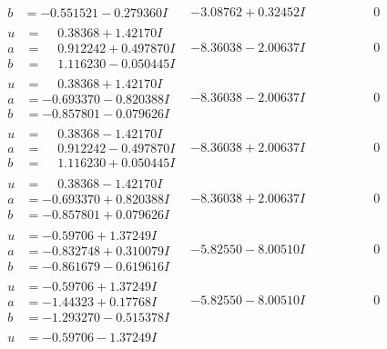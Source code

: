 \documentclass[1p]{elsarticle_modified}
\theoremstyle{definition}
\begin{document}
$$\begin{array}{c|c|c}
\begin{aligned}
b &= -0.551521 - 0.279360 I\end{aligned}
 & -3.08762 + 0.32452 I & \phantom{-0.000000 } 0 \\ \hline\begin{aligned}
u &= \phantom{-}0.38368 + 1.42170 I \\
a &= \phantom{-}0.912242 + 0.497870 I \\
b &= \phantom{-}1.116230 - 0.050445 I\end{aligned}
 & -8.36038 - 2.00637 I & \phantom{-0.000000 } 0 \\ \hline\begin{aligned}
u &= \phantom{-}0.38368 + 1.42170 I \\
a &= -0.693370 - 0.820388 I \\
b &= -0.857801 - 0.079626 I\end{aligned}
 & -8.36038 - 2.00637 I & \phantom{-0.000000 } 0 \\ \hline\begin{aligned}
u &= \phantom{-}0.38368 - 1.42170 I \\
a &= \phantom{-}0.912242 - 0.497870 I \\
b &= \phantom{-}1.116230 + 0.050445 I\end{aligned}
 & -8.36038 + 2.00637 I & \phantom{-0.000000 } 0 \\ \hline\begin{aligned}
u &= \phantom{-}0.38368 - 1.42170 I \\
a &= -0.693370 + 0.820388 I \\
b &= -0.857801 + 0.079626 I\end{aligned}
 & -8.36038 + 2.00637 I & \phantom{-0.000000 } 0 \\ \hline\begin{aligned}
u &= -0.59706 + 1.37249 I \\
a &= -0.832748 + 0.310079 I \\
b &= -0.861679 - 0.619616 I\end{aligned}
 & -5.82550 - 8.00510 I & \phantom{-0.000000 } 0 \\ \hline\begin{aligned}
u &= -0.59706 + 1.37249 I \\
a &= -1.44323 + 0.17768 I \\
b &= -1.293270 - 0.515378 I\end{aligned}
 & -5.82550 - 8.00510 I & \phantom{-0.000000 } 0 \\ \hline\begin{aligned}
u &= -0.59706 - 1.37249 I \\

\end{aligned}
\end{array}$$
\end{document}
